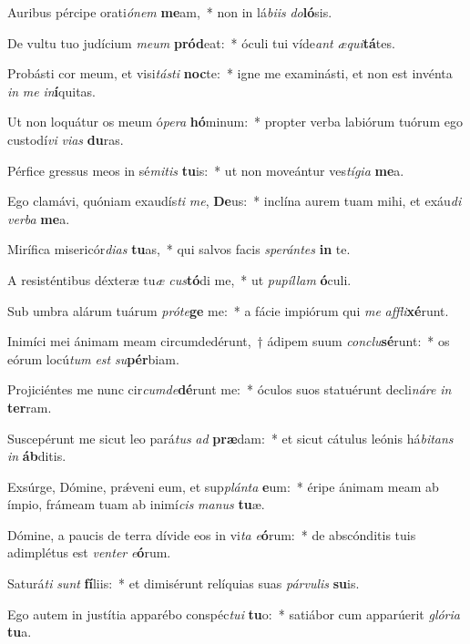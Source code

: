 \item Auribus pércipe orati\textit{ó}\textit{nem} \textbf{me}am,~* non in lá\textit{bi}\textit{is} \textit{do}\textbf{ló}sis.
\item De vultu tuo judícium \textit{me}\textit{um} \textbf{pród}eat:~* óculi tui víde\textit{ant} \textit{æ}\textit{qui}\textbf{tá}tes.
\item Probásti cor meum, et visi\textit{tás}\textit{ti} \textbf{noc}te:~* igne me examinásti, et non est invénta \textit{in} \textit{me} \textit{in}\textbf{í}quitas.
\item Ut non loquátur os meum ó\textit{pe}\textit{ra} \textbf{hó}minum:~* propter verba labiórum tuórum ego custodí\textit{vi} \textit{vi}\textit{as} \textbf{du}ras.
\item Pérfice gressus meos in sé\textit{mi}\textit{tis} \textbf{tu}is:~* ut non moveántur ves\textit{tí}\textit{gi}\textit{a} \textbf{me}a.
\item Ego clamávi, quóniam exaudís\textit{ti} \textit{me}, \textbf{De}us:~* inclína aurem tuam mihi, et exáu\textit{di} \textit{ver}\textit{ba} \textbf{me}a.
\item Mirífica misericór\textit{di}\textit{as} \textbf{tu}as,~* qui salvos facis \textit{spe}\textit{rán}\textit{tes} \textbf{in} te.
\item A resisténtibus déxteræ tu\textit{æ} \textit{cus}\textbf{tó}di me,~* ut \textit{pu}\textit{píl}\textit{lam} \textbf{ó}culi.
\item Sub umbra alárum tuárum \textit{pró}\textit{te}\textbf{ge} me:~* a fácie impiórum qui \textit{me} \textit{af}\textit{fli}\textbf{xé}runt.
\item Inimíci mei ánimam meam circumdedérunt,~† ádipem suum \textit{con}\textit{clu}\textbf{sé}runt:~* os eórum locú\textit{tum} \textit{est} \textit{su}\textbf{pér}biam.
\item Projiciéntes me nunc cir\textit{cum}\textit{de}\textbf{dé}runt me:~* óculos suos statuérunt decli\textit{ná}\textit{re} \textit{in} \textbf{ter}ram.
\item Suscepérunt me sicut leo pará\textit{tus} \textit{ad} \textbf{præ}dam:~* et sicut cátulus leónis há\textit{bi}\textit{tans} \textit{in} \textbf{áb}ditis.
\item Exsúrge, Dómine, prǽveni eum, et sup\textit{plán}\textit{ta} \textbf{e}um:~* éripe ánimam meam ab ímpio, frámeam tuam ab inimí\textit{cis} \textit{ma}\textit{nus} \textbf{tu}æ.
\item Dómine, a paucis de terra dívide eos in vi\textit{ta} \textit{e}\textbf{ó}rum:~* de abscónditis tuis adimplétus est \textit{ven}\textit{ter} \textit{e}\textbf{ó}rum.
\item Saturá\textit{ti} \textit{sunt} \textbf{fí}liis:~* et dimisérunt relíquias suas \textit{pár}\textit{vu}\textit{lis} \textbf{su}is.
\item Ego autem in justítia apparébo conspéc\textit{tu}\textit{i} \textbf{tu}o:~* satiábor cum apparúerit \textit{gló}\textit{ri}\textit{a} \textbf{tu}a.
